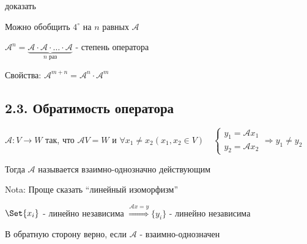 \documentclass[12pt]{article}
\begin{document}
    \Lab доказать

    \Nota Можно обобщить $4^\circ$ на $n$ равных $\mathcal{A}$

    \Defs $\mathcal{A}^n = \underset{n \text{ раз}}{\underbrace{\mathcal{A} \cdot \mathcal{A} \cdot \dots \cdot \mathcal{A}}}$ - степень оператора

    Свойства: $\mathcal{A}^{m + n} = \mathcal{A}^n \cdot \mathcal{A}^m$

    \subsection{2.3. Обратимость оператора}

    \hypertarget{onetoonelinearoperator}{}

    \Def $\mathcal{A} : V \rightarrow W$ так, что $\mathcal{A}V = W$ и $\forall x_1 \neq x_2 (x_1, x_2 \in V) \quad
    \begin{cases}y_1 = \mathcal{A}x_1 \\ y_2 = \mathcal{A}x_2\end{cases} \Longrightarrow y_1 \neq y_2$

    Тогда $\mathcal{A}$ называется взаимно-однозначно действующим

    Nota: Проще сказать \enquote{линейный изоморфизм}

    \begin{MyTheorem}
        \Ths $\Set{x_i}$ - линейно независима $\stackrel{\mathcal{A}x = y}{\Longrightarrow} \{y_i\}$ - линейно независима

        В обратную сторону верно, если $\mathcal{A}$ - взаимно-однозначен
    \end{MyTheorem}
\end{document}

